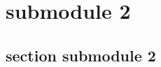 \documentclass[module]{subfiles}
\begin{document}

\chapter{submodule 2}

\section{section submodule 2}
\lipsum[1]
\end{document}
